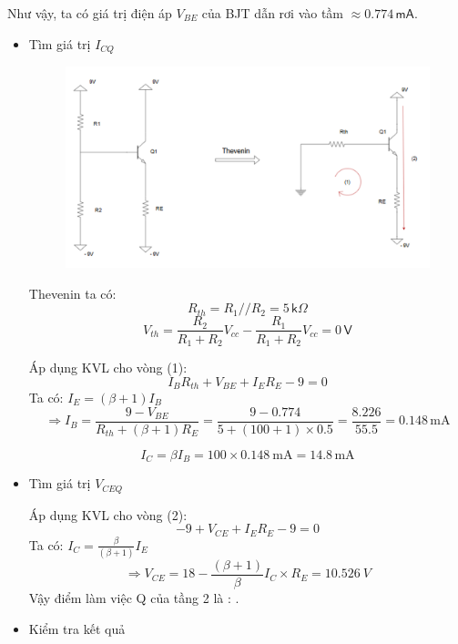 Như vậy, ta có giá trị điện áp $V_{BE}$ của BJT dẫn rơi vào tầm $\approx 0.774\,\textsf{mA}$.

\begin{itemize}[label=-]
	\item Tìm giá trị $I_{CQ}$
	
	\begin{figure}[H]
		\centering
		\includegraphics[width=.9\linewidth]{./my-chapters/my-images/Question3/a_thevenin.png}
	\end{figure}
	
	Thevenin ta có:
	\[ R_{th} = R_{1} // R_{2} = 5\,\textsf{k}\Omega \]
	\[ V_{th} = \dfrac{R_{2}}{R_{1} + R_{2}} V_{cc} - \dfrac{R_{1}}{R_{1} + R_{2}}V_{cc} = 0\,\textsf{V} \]
	
	Áp dụng KVL cho vòng (1):
	\[ I_{B}R_{th} + V_{BE} + I_{E}R_{E} - 9 = 0 \]
	Ta có: $I_E = (\beta + 1)I_B$
	\[
	\Longrightarrow I_B = \frac{9 - V_{BE}}{R_{th} + (\beta + 1)R_E}
	= \frac{9 - 0.774}{5 + (100 + 1)\times 0.5}
	= \frac{8.226}{55.5}
	= 0.148\,\text{mA}
	\]
	
	\[
	I_C = \beta I_B = 100 \times 0.148\ \text{mA}
	= 14.8\,\text{mA}
	\]
	
	\item Tìm giá trị $V_{CEQ}$
	
	Áp dụng KVL cho vòng (2):
	\[-9+V_{CE}+I_E R_E-9=0 \]
	Ta có: $I_C=\frac{\beta}{\left(\beta+1\right)}I_E$
	\[\Rightarrow V_{CE}=18-\frac{\left(\beta+1\right)}{\beta}I_C\times R_E=10.526\ V\]
	Vậy điểm làm việc Q của tầng 2 là : .
	
	\item Kiểm tra kết quả
	

\end{itemize}
